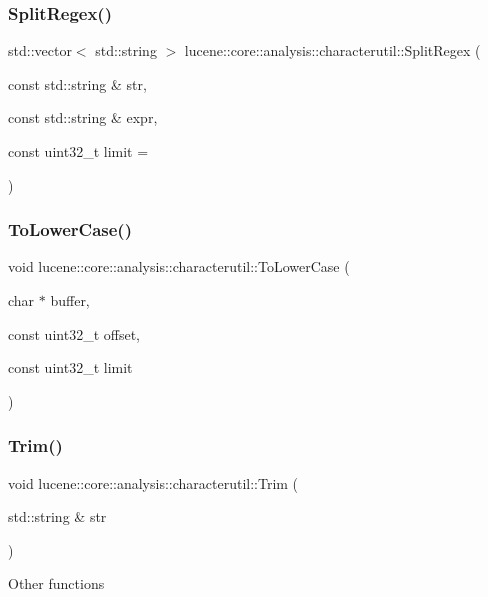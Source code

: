 \subsubsection{\texorpdfstring{Split\+Regex()}{SplitRegex()}}
{\footnotesize\ttfamily std\+::vector$<$ std\+::string $>$ lucene\+::core\+::analysis\+::characterutil\+::\+Split\+Regex (\begin{DoxyParamCaption}\item[{const std\+::string \&}]{str,  }\item[{const std\+::string \&}]{expr,  }\item[{const uint32\+\_\+t}]{limit = {} }\end{DoxyParamCaption})}

\mbox{\label{namespacelucene_1_1core_1_1analysis_1_1characterutil_a8970bd9664a398220515d53e97cb051c}} 
\subsubsection{\texorpdfstring{To\+Lower\+Case()}{ToLowerCase()}}
{\footnotesize\ttfamily void lucene\+::core\+::analysis\+::characterutil\+::\+To\+Lower\+Case (\begin{DoxyParamCaption}\item[{char $\ast$}]{buffer,  }\item[{const uint32\+\_\+t}]{offset,  }\item[{const uint32\+\_\+t}]{limit }\end{DoxyParamCaption})}

\mbox{\label{namespacelucene_1_1core_1_1analysis_1_1characterutil_a8deb75debf79b7151ec2fed2b932bdde}} 
\subsubsection{\texorpdfstring{Trim()}{Trim()}}
{\footnotesize\ttfamily void lucene\+::core\+::analysis\+::characterutil\+::\+Trim (\begin{DoxyParamCaption}\item[{std\+::string \&}]{str }\end{DoxyParamCaption})}

Other functions 